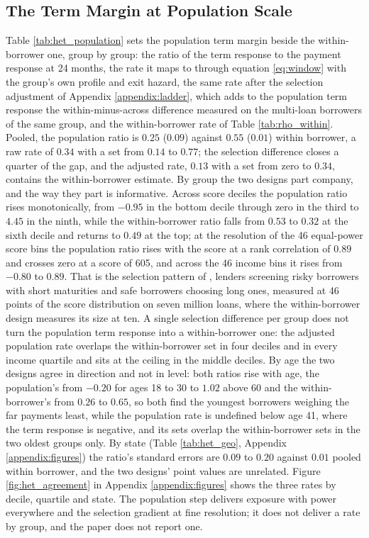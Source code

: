\subsection{The Term Margin at Population Scale}\label{sec:termmargin_pop}

Table \ref{tab:het_population} sets the population term margin beside the within-borrower one, group by group: the ratio of the term response to the payment response at 24 months, the rate it maps to through equation \eqref{eq:window} with the group's own profile and exit hazard, the same rate after the selection adjustment of Appendix \ref{appendix:ladder}, which adds to the population term response the within-minus-across difference measured on the multi-loan borrowers of the same group, and the within-borrower rate of Table \ref{tab:rho_within}. Pooled, the population ratio is $0.25$ ($0.09$) against $0.55$ ($0.01$) within borrower, a raw rate of $0.34$ with a set from $0.14$ to $0.77$; the selection difference closes a quarter of the gap, and the adjusted rate, $0.13$ with a set from zero to $0.34$, contains the within-borrower estimate. By group the two designs part company, and the way they part is informative. Across score deciles the population ratio rises monotonically, from $-0.95$ in the bottom decile through zero in the third to $4.45$ in the ninth, while the within-borrower ratio falls from $0.53$ to $0.32$ at the sixth decile and returns to $0.49$ at the top; at the resolution of the 46 equal-power score bins the population ratio rises with the score at a rank correlation of $0.89$ and crosses zero at a score of 605, and across the 46 income bins it rises from $-0.80$ to $0.89$. That is the selection pattern of \citet{hertzberg_screening_2018}, lenders screening risky borrowers with short maturities and safe borrowers choosing long ones, measured at 46 points of the score distribution on seven million loans, where the within-borrower design measures its size at ten. A single selection difference per group does not turn the population term response into a within-borrower one: the adjusted population rate overlaps the within-borrower set in four deciles and in every income quartile and sits at the ceiling in the middle deciles. By age the two designs agree in direction and not in level: both ratios rise with age, the population's from $-0.20$ for ages 18 to 30 to $1.02$ above 60 and the within-borrower's from $0.26$ to $0.65$, so both find the youngest borrowers weighing the far payments least, while the population rate is undefined below age 41, where the term response is negative, and its sets overlap the within-borrower sets in the two oldest groups only. By state (Table \ref{tab:het_geo}, Appendix \ref{appendix:figures}) the ratio's standard errors are $0.09$ to $0.20$ against $0.01$ pooled within borrower, and the two designs' point values are unrelated. Figure \ref{fig:het_agreement} in Appendix \ref{appendix:figures} shows the three rates by decile, quartile and state. The population step delivers exposure with power everywhere and the selection gradient at fine resolution; it does not deliver a rate by group, and the paper does not report one.

